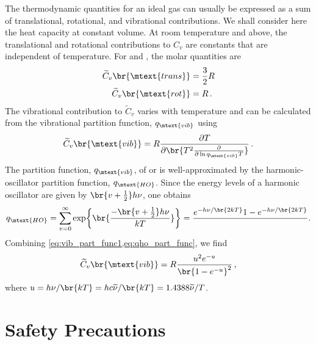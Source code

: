 \documentclass[nobib,nofonts,nols,nohyper]{tufte-handout}
\begin{document}
The thermodynamic quantities for an ideal gas can usually be expressed as a sum of translational, rotational, and vibrational contributions. 
We shall consider here the heat capacity at constant volume. 
At room temperature and above, the translational and rotational contributions to \( C_v \) are constants that are independent of temperature. 
For  and , the molar quantities are 
\begin{align}
	\begin{split}
		\widetilde{C}_v\br{\mtext{trans}}	&=	\frac{3}{2}R \\
		\widetilde{C}_v\br{\mtext{rot}}		&=	R \, .
	\end{split}
	\label{eq:c_v_rot_vib}
\end{align}
The vibrational contribution to \( \widetilde{C}_v \) varies with temperature and can be calculated from the vibrational partition function, \( q_\mtext{vib} \) using 
\begin{equation}
	\widetilde{C}_v\br{\mtext{vib}} = R \pdv{T}\br{T^2 \pdv{\ln{q_\mtext{vib}}{T}}} \, .
	\label{eq:vib_part_func1}
\end{equation}
The partition function, \( q_\mtext{vib} \), of  or  is well-approximated by the harmonic-oscillator partition function, \( q_\mtext{HO} \). 
Since the energy levels of a harmonic oscillator are given by \( \br{v + \tfrac{1}{2}} h \nu \), one obtains\autocite{levine95}
\begin{equation}
	q_\mtext{HO} = \sum_{v = 0}^\infty \exp \br{\frac{-\br{v + \tfrac{1}{2}} h \nu}{k T}} = \frac{e^{-h \nu/\br{2kT}}{1 - e^{-h \nu / \br{2 k T}}}} \, .
	\label{eq:qho_part_func}
\end{equation}
Combining \cref{eq:vib_part_func1,eq:qho_part_func}, we find 
\begin{equation}
	\widetilde{C}_v\br{\mtext{vib}} = R \frac{u^2 e^{-u}}{\br{1 - e^{-u}}^2} \, ,
	\label{eq:vib_part_func2}
\end{equation}
where \( u = h \nu / \br{kT} = h c \widetilde{\nu} / \br{k T} = 1.4388 \widetilde{\nu} / T \). 




\pagebreak

\section{Safety Precautions} %
\label{sec:safety}
\end{document}

